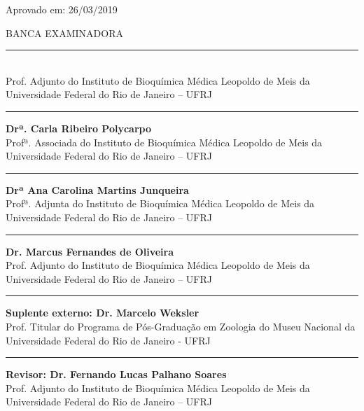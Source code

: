 \documentclass[
	12pt,				%
	oneside,
	a4paper,			%
	english,			%
	spanish,			%
	brazil				%
	]{abntex2}
\begin{document}
%
% 
%
\begin{folhadeaprovacao}

\begin{center}
      \ABNTEXchapterfont\imprimirtitulo
      \vspace{\fill}
      \ABNTEXchapterfont\large\imprimirautor
      \vspace{\fill}
	\begin{flushleft}
		\ABNTEXchapterfont\large\imprimirpreambulo\vfill
		 
		Aprovado em: 26/03/2019
	\end{flushleft}
	BANCA EXAMINADORA
	\vspace{\fill}
	\hrule\textbf{\imprimirorientador} \\ Prof. Adjunto do Instituto de Bioquímica Médica Leopoldo de Meis da Universidade Federal do Rio de Janeiro – UFRJ
	\vspace{\fill}
	\hrule\textbf{Drª. Carla Ribeiro Polycarpo} \\ Profª. Associada do Instituto de Bioquímica Médica Leopoldo de Meis da Universidade Federal do Rio de Janeiro – UFRJ
	\vspace{\fill}
	\hrule\textbf{Drª Ana Carolina Martins Junqueira} \\ Profª. Adjunta do Instituto de Bioquímica Médica Leopoldo de Meis da Universidade Federal do Rio de Janeiro – UFRJ
	\vspace{\fill}
	\hrule\textbf{Dr. Marcus Fernandes de Oliveira} \\ Prof. Adjunto do Instituto de Bioquímica Médica Leopoldo de Meis da Universidade Federal do Rio de Janeiro – UFRJ
	\vspace{\fill}
	\hrule\textbf{Suplente externo: Dr. Marcelo Weksler} \\ Prof. Titular do Programa de Pós-Graduação em Zoologia do Museu Nacional da Universidade Federal do Rio de Janeiro - UFRJ
	\vspace{\fill}
	\hrule\textbf{Revisor: Dr.  Fernando Lucas Palhano Soares} \\ Prof. Adjunto do Instituto de Bioquímica Médica Leopoldo de Meis da Universidade Federal do Rio de Janeiro – UFRJ \\
\end{center}
  
\end{folhadeaprovacao}
\end{document}
